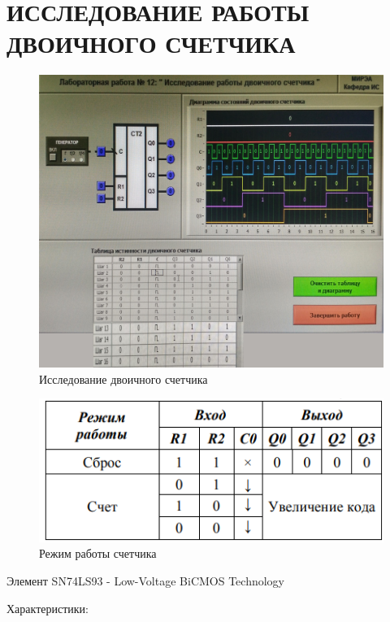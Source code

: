 \section{ИССЛЕДОВАНИЕ РАБОТЫ ДВОИЧНОГО СЧЕТЧИКА}



\begin{figure}[H]
	\centering
	\includegraphics[width=0.95\linewidth]{imgs/12/1.jpg}
	\caption{Исследование двоичного счетчика }
	\label{fig:12_1}
\end{figure}


\begin{figure}[H]
	\centering
	\includegraphics[width=0.85\linewidth]{imgs/12/12_tab}
	\caption{Режим работы счетчика}
	\label{fig:12_tab}
\end{figure}

Элемент SN74LS93 - Low-Voltage BiCMOS Technology

Характеристики:



